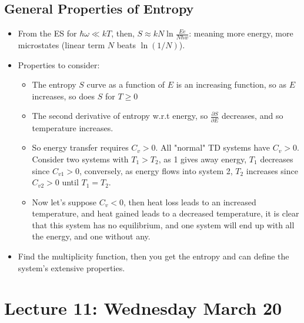 \documentclass[8pt]{article}
\begin{document}
\subsection{General Properties of Entropy}
\begin{itemize}
    \item From the ES for $\hbar \omega \ll kT $, then, $S \approx kN \ln \frac{Ee}{N\hbar w}$: meaning more energy, more microstates (linear term $N$ beats $\ln(1/N)$). 
    \item Properties to consider:
    \begin{itemize}
        \item The entropy $S$ curve as a function of $E$ is an increasing function, so as $E$ increases, so does $S$ for $T \geq 0$
        \item The second derivative of entropy w.r.t energy, so $\frac{\partial S}{\partial E}$ decreases, and so temperature increases. 
        \item So energy transfer requires $C_v > 0$. All "normal" TD systems have $C_v >0$. Consider two systems with $T_1 > T_2$, as 1 gives away energy, $T_1$ decreases since $C_{v1} >0$, conversely, as energy flows into system 2, $T_2 $ increases since $C_{v2} > 0$ until $T_1 = T_2$. 
        \item Now let's suppose $C_v < 0$, then heat loss leads to an increased temperature, and heat gained leads to a decreased temperature, it is clear that this system has no equilibrium, and one system will end up with all the energy, and one without any. 
    \end{itemize}
    \item Find the multiplicity function, then you get the entropy and can define the system's extensive properties. 
\end{itemize}



\section{Lecture 11: Wednesday March 20}
\end{document}
